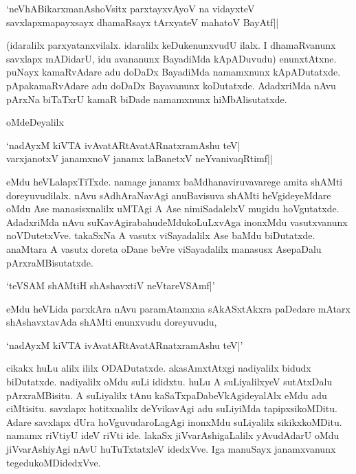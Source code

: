 \begin{shloka}
`neVhABikarxmanAshoVsitx parxtayxvAyoV na vidayxteV\\
savxlapxmapayxsayx dhamaRsayx tArxyateV mahatoV BayAtf||
\end{shloka}

(idaralilx parxyatanxvilalx. idaralilx keDukenunxvudU ilalx. I dhamaRvanunx savxlapx mADidarU, idu avananunx BayadiMda kApADuvudu) enunxtAtxne. puNayx kamaRvAdare adu doDaDx BayadiMda namamxnunx kApADutatxde. pApakamaRvAdare adu doDaDx Bayavanunx koDutatxde. AdadxriMda nAvu pArxNa biTaTxrU kamaR biDade namamxnunx hiMbAlisutatxde.

oMdeDeyalilx

\begin{shloka}
`nadAyxM kiVTA ivAvatARtAvatARnatxramAshu teV|\\
varxjanotxV janamxnoV janamx laBanetxV neYvanivaqRtimf||
\end{shloka}

eMdu heVLalapxTiTxde. namage janamx baMdhanaviruvavarege amita shAMti doreyuvudilalx. nAvu sAdhAraNavAgi anuBavisuva shAMti heVgideyeMdare oMdu Ase manasisxnalilx uMTAgi A Ase nimiSadalelxV mugidu hoVgutatxde. AdadxriMda nAvu suKavAgirabahudeMdukoLuLxvAga inonxMdu vasutxvanunx noVDutetxVve. takaSxNa A vasutx viSayadalilx Ase baMdu biDutatxde. anaMtara A vasutx doreta oDane beVre viSayadalilx manasusx AsepaDalu pArxraMBisutatxde.

\begin{shloka}
`teVSAM shAMtiH shAshavxtiV neVtareVSAmf|'
\end{shloka}

eMdu heVLida parxkAra nAvu paramAtamxna sAkASxtAkxra paDedare mAtarx shAshavxtavAda shAMti enunxvudu doreyuvudu,

\begin{shloka}
`nadAyxM kiVTA ivAvatARtAvatARnatxramAshu teV|'
\end{shloka}

cikakx huLu alilx ililx ODADutatxde. akasAmxtAtxgi nadiyalilx bidudx biDutatxde. nadiyalilx oMdu suLi ididxtu. huLu A suLiyalilxyeV sutAtxDalu pArxraMBisitu. A suLiyalilx tAnu kaSaTxpaDabeVkAgideyalAlx eMdu adu ciMtisitu. savxlapx hotitxnalilx deYvikavAgi adu suLiyiMda tapipxsikoMDitu. Adare savxlapx dUra hoVguvudaroLagAgi inonxMdu suLiyalilx sikikxkoMDitu. namamx riVtiyU ideV riVti ide. {}lakaSx jiVvarAshigaLalilx yAvudAdarU oMdu jiVvarAshiyAgi nAvU huTuTxtatxleV idedxVve. Iga manuSayx janamxvanunx tegedukoMDidedxVve.

